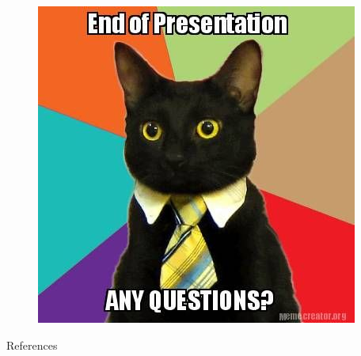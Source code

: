 \documentclass{beamer}
\begin{document}
\begin{frame}
    \begin{figure}
        \centering
        \includegraphics[scale=0.6]{Images/endOfSlide.jpg}
    \end{figure}
\end{frame}

\begin{frame}[allowframebreaks]{References}
    
    
\end{frame}
\end{document}
